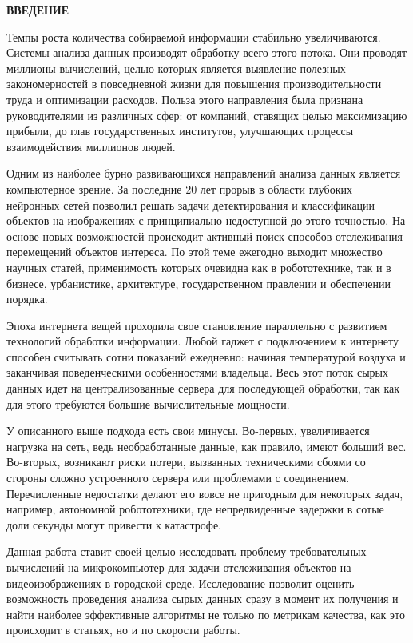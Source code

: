 \newpage
\renewcommand{\contentsname}{\centerline{\large СОДЕРЖАНИЕ}}
\tableofcontents

\newpage
\begin{flushleft}
  \textbf{\large ВВЕДЕНИЕ}
\end{flushleft}

Темпы роста количества собираемой информации стабильно увеличиваются. Системы анализа данных производят обработку всего этого потока.
Они проводят миллионы вычислений, целью которых является выявление полезных закономерностей в повседневной жизни для повышения производительности труда и оптимизации расходов. 
Польза этого направления была признана руководителями из различных сфер: от компаний, ставящих целью максимизацию прибыли, до глав государственных институтов, улучшающих процессы взаимодействия миллионов людей.

Одним из наиболее бурно развивающихся направлений анализа данных является компьютерное зрение. 
За последние 20 лет прорыв в области глубоких нейронных сетей позволил решать задачи детектирования и классификации объектов на изображениях с принципиально недоступной до этого точностью.
На основе новых возможностей происходит активный поиск способов отслеживания перемещений объектов интереса. По этой теме ежегодно выходит множество научных статей, применимость которых очевидна как в робототехнике, так и в бизнесе, урбанистике, архитектуре, государственном правлении и обеспечении порядка.

Эпоха интернета вещей проходила свое становление параллельно с развитием технологий обработки информации.
Любой гаджет с подключением к интернету способен считывать сотни показаний ежедневно: начиная температурой воздуха и заканчивая поведенческими особенностями владельца.
Весь этот поток сырых данных идет на централизованные сервера для последующей обработки, так как для этого требуются большие вычислительные мощности.

У описанного выше подхода есть свои минусы. Во-первых, увеличивается нагрузка на сеть, ведь необработанные данные, как правило, имеют больший вес. Во-вторых, возникают риски потери, вызванных техническими сбоями со стороны сложно устроенного сервера или проблемами с соединением.
Перечисленные недостатки делают его вовсе не пригодным для некоторых задач, например, автономной робототехники, где непредвиденные задержки в сотые доли секунды могут привести к катастрофе. 

Данная работа ставит своей целью исследовать проблему требовательных вычислений на микрокомпьютер для задачи отслеживания объектов на видеоизображениях в городской среде. 
Исследование позволит оценить возможность проведения анализа сырых данных сразу в момент их получения и найти наиболее эффективные алгоритмы не только по метрикам качества, как это происходит в статьях, но и по скорости работы.

